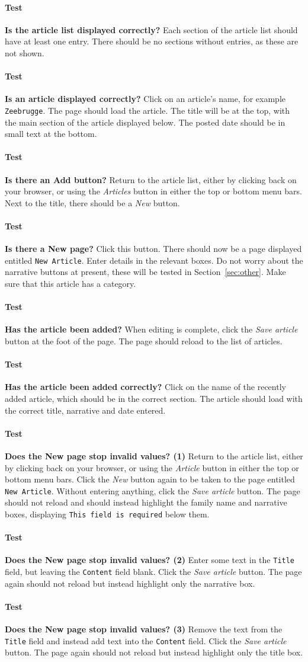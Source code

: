 \documentclass[12pt]{article}
\newcounter{Test}
\newcommand{\test}[1]{%
\stepcounter{Test}%
\paragraph{Test \theTest} \textbf{#1} }
\begin{document}
\test{Is the article list displayed correctly?}
Each section of the article list should have at least one entry. There should be no sections without entries, as these are not shown.

\test{Is an article displayed correctly?}
Click on an article's name, for example \texttt{Zeebrugge}. The page should load the article. The title will be at the top, with the main section of the article displayed below. The posted date should be in small text at the bottom.

\test{Is there an Add button?}
Return to the article list, either by clicking back on your browser, or using the \textit{Articles} button in either the top or bottom menu bars. Next to the title, there should be a \textit{New} button.

\test{Is there a New page?}
Click this button. There should now be a page displayed entitled \texttt{New Article}. Enter details in the relevant boxes. Do not worry about the narrative buttons at present, these will be tested in Section~\ref{sec:other}. Make sure that this article has a category.

\test{Has the article been added?}
When editing is complete, click the \textit{Save article} button at the foot of the page. The page should reload to the list of articles.

\test{Has the article been added correctly?}
Click on the name of the recently added article, which should be in the correct section. The article should load with the correct title, narrative and date entered.

\test{Does the New page stop invalid values? (1)}
Return to the article list, either by clicking back on your browser, or using the \textit{Article} button in either the top or bottom menu bars. Click the \textit{New} button again to be taken to the page entitled \texttt{New Article}. Without entering anything, click the \textit{Save article} button. The page should not reload and should instead highlight the family name and narrative boxes, displaying \texttt{This field is required} below them.

\test{Does the New page stop invalid values? (2)}
Enter some text in the \texttt{Title} field, but leaving the \texttt{Content} field blank. Click the \textit{Save article} button. The page again should not reload but instead highlight only the narrative box.

\test{Does the New page stop invalid values? (3)}
Remove the text from the \texttt{Title} field and instead add text into the \texttt{Content} field. Click the \textit{Save article} button. The page again should not reload but instead highlight only the title box.
\end{document}
